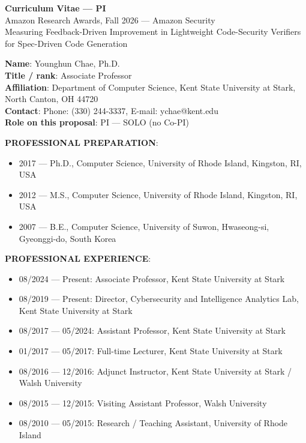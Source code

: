 \documentclass[11pt]{article}
\begin{document}
\begin{center}
{\Large\bfseries Curriculum Vitae --- PI}\\[2pt]
{\large Amazon Research Awards, Fall 2026 --- Amazon Security}\\[2pt]
{\large Measuring Feedback-Driven Improvement in Lightweight Code-Security Verifiers for Spec-Driven Code Generation}
\end{center}

\bigskip
\noindent\textbf{Name}: Younghun Chae, Ph.D. \\
\textbf{Title / rank}: Associate Professor \\
\textbf{Affiliation}: Department of Computer Science, Kent State University at Stark, North Canton, OH 44720 \\
\textbf{Contact}: Phone: (330) 244-3337, E-mail: ychae@kent.edu \\
\textbf{Role on this proposal}: PI --- SOLO (no Co-PI)

\medskip
\textbf{PROFESSIONAL PREPARATION}:
\begin{itemize}[nosep]
\item 2017 --- Ph.D., Computer Science, University of Rhode Island, Kingston, RI, USA
\item 2012 --- M.S., Computer Science, University of Rhode Island, Kingston, RI, USA
\item 2007 --- B.E., Computer Science, University of Suwon, Hwaseong-si, Gyeonggi-do, South Korea
\end{itemize}

\textbf{PROFESSIONAL EXPERIENCE}:
\begin{itemize}[nosep]
\item 08/2024 --- Present: Associate Professor, Kent State University at Stark
\item 08/2019 --- Present: Director, Cybersecurity and Intelligence Analytics Lab, Kent State University at Stark
\item 08/2017 --- 05/2024: Assistant Professor, Kent State University at Stark
\item 01/2017 --- 05/2017: Full-time Lecturer, Kent State University at Stark
\item 08/2016 --- 12/2016: Adjunct Instructor, Kent State University at Stark / Walsh University
\item 08/2015 --- 12/2015: Visiting Assistant Professor, Walsh University
\item 08/2010 --- 05/2015: Research / Teaching Assistant, University of Rhode Island
\end{itemize}
\end{document}
